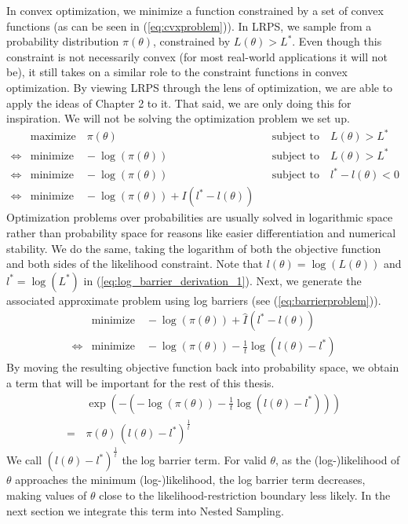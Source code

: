 \documentclass[12pt, a4paper]{report}
\begin{document}
In convex optimization, we minimize a function constrained by a set of convex functions (as can be seen in (\ref{eq:cvxproblem})).
In LRPS, we sample from a probability distribution $\pi(\theta)$, constrained by $L(\theta) > L^*$.
Even though this constraint is not necessarily convex (for most real-world applications it will not be), it still takes on a similar role to the constraint functions in convex optimization.
By viewing LRPS through the lens of optimization, we are able to apply the ideas of Chapter 2 to it.
That said, we are only doing this for inspiration.
We will not be solving the optimization problem we set up.
\begin{align}
    &\textrm{maximize} \quad \pi(\theta) &&\textrm{subject to} \quad L(\theta) > L^* \nonumber\\
    \iff &\textrm{minimize} \quad -\log(\pi(\theta)) &&\textrm{subject to} \quad L(\theta) > L^* \nonumber\\
    \iff &\textrm{minimize} \quad -\log(\pi(\theta)) &&\textrm{subject to} \quad l^* - l(\theta) < 0 \label{eq:log_barrier_derivation_1}\\
    \iff &\textrm{minimize} \quad -\log(\pi(\theta)) + I(l^* - l(\theta)) \nonumber
\end{align}
Optimization problems over probabilities are usually solved in logarithmic space rather than probability space for reasons like easier differentiation and numerical stability.
We do the same, taking the logarithm of both the objective function and both sides of the likelihood constraint.
Note that $l(\theta) = \log(L(\theta))$ and $l^* = \log(L^*)$ in (\ref{eq:log_barrier_derivation_1}).
Next, we generate the associated approximate problem using log barriers (see (\ref{eq:barrierproblem})).
\begin{align*}
    &\textrm{minimize} \quad -\log(\pi(\theta)) + \hat{I}(l^* - l(\theta)) \\
    \iff &\textrm{minimize} \quad -\log(\pi(\theta)) - \frac{1}{t}\log(l(\theta) - l^*)
\end{align*}
By moving the resulting objective function back into probability space, we obtain a term that will be important for the rest of this thesis.
\begin{align}
    &\exp(-(-\log(\pi(\theta)) - \frac{1}{t}\log(l(\theta) - l^*))) \nonumber\\
    = \, &\pi(\theta) \, (l(\theta) - l^*)^{\frac{1}{t}} \label{eq:log_barrier_term}
\end{align}
We call $(l(\theta) - l^*)^\frac{1}{t}$ the log barrier term.
For valid $\theta$, as the (log-)likelihood of $\theta$ approaches the minimum (log-)likelihood, the log barrier term decreases, making values of $\theta$ close to the likelihood-restriction boundary less likely.
In the next section we integrate this term into Nested Sampling.
\end{document}
